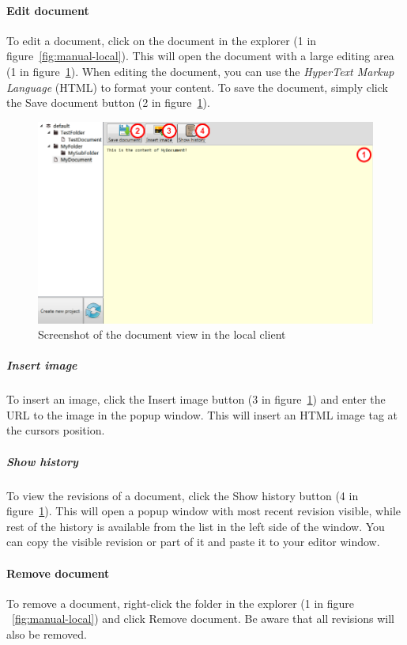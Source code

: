 	\paragraph{Edit document}
	To edit a document, click on the document in the explorer (1 in figure~\ref{fig:manual-local}). This will open the document with a large editing area (1 in figure~\ref{fig:manual-local-document}). When editing the document, you can use the \emph{HyperText Markup Language}\cite{w3cHTML} (HTML) to format your content. To save the document, simply click the Save document button (2 in figure~\ref{fig:manual-local-document}).
	
	\begin{figure}[htb]
		\centering
		\includegraphics[width=1\textwidth]{User_manual/graphics/local-document.png}
		\caption{Screenshot of the document view in the local client}
		\label{fig:manual-local-document}
	\end{figure}
	
		\subparagraph{Insert image}
		To insert an image, click the Insert image button (3 in figure~\ref{fig:manual-local-document}) and enter the URL to the image in the popup window. This will insert an HTML image tag at the cursors position.
		
		\subparagraph{Show history}
		To view the revisions of a document, click the Show history button (4 in figure~\ref{fig:manual-local-document}). This will open a popup window with most recent revision visible, while rest of the history is available from the list in the left side of the window. You can copy the visible revision or part of it and paste it to your editor window.
	
	\paragraph{Remove document}
	To remove a document, right-click the folder in the explorer (1 in figure ~\ref{fig:manual-local}) and click Remove document. Be aware that all revisions will also be removed.
